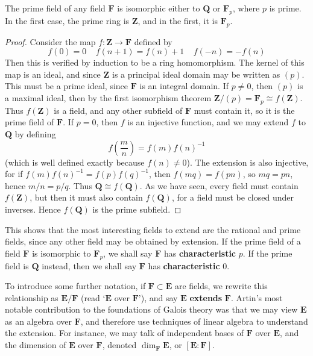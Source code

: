\begin{lemma}
    The prime field of any field $\mathbf{F}$ is isomorphic either to $\mathbf{Q}$ or $\mathbf{F}_p$, where $p$ is prime. In the first case, the prime ring is $\mathbf{Z}$, and in the first, it is $\mathbf{F}_p$.
\end{lemma}
\begin{proof}
    Consider the map $f: \mathbf{Z} \to \mathbf{F}$ defined by
    \[ f(0) = 0\ \ \ \ \ f(n+1) = f(n) + 1\ \ \ \ \ f(-n) = -f(n) \]
    Then this is verified by induction to be a ring homomorphism. The kernel of this map is an ideal, and since $\mathbf{Z}$ is a principal ideal domain may be written as $(p)$. This must be a prime ideal, since $\mathbf{F}$ is an integral domain. If $p \neq 0$, then $(p)$ is a maximal ideal, then by the first isomorphism theorem $\mathbf{Z} / (p) = \mathbf{F}_p \cong f(\mathbf{Z})$. Thus $f(\mathbf{Z})$ is a field, and any other subfield of $\mathbf{F}$ must contain it, so it is the prime field of $\mathbf{F}$. If $p = 0$, then $f$ is an injective function, and we may extend $f$ to $\mathbf{Q}$ by defining
    \[ f\left( \frac{m}{n} \right) = f(m) f(n)^{-1} \]
    (which is well defined exactly because $f(n) \neq 0$). The extension is also injective, for if $f(m) f(n)^{-1} = f(p) f(q)^{-1}$, then $f(mq) = f(pn)$, so $mq = pn$, hence $m/n = p/q$. Thus $\mathbf{Q} \cong f(\mathbf{Q})$. As we have seen, every field must contain $f(\mathbf{Z})$, but then it must also contain $f(\mathbf{Q})$, for a field must be closed under inverses. Hence $f(\mathbf{Q})$ is the prime subfield.
\end{proof}

This shows that the most interesting fields to extend are the rational and prime fields, since any other field may be obtained by extension. If the prime field of a field $\mathbf{F}$ is isomorphic to $\mathbf{F}_p$, we shall say $\mathbf{F}$ has {\bf characteristic} $p$. If the prime field is $\mathbf{Q}$ instead, then we shall say $\mathbf{F}$ has {\bf characteristic} 0.

To introduce some further notation, if $\mathbf{F} \subset \mathbf{E}$ are fields, we rewrite this relationship as $\mathbf{E}/\mathbf{F}$ (read `$\mathbf{E}$ over $\mathbf{F}$'), and say $\mathbf{E}$ {\bf extends} $\mathbf{F}$. Artin's most notable contribution to the foundations of Galois theory was that we may view $\mathbf{E}$ as an algebra over $\mathbf{F}$, and therefore use techniques of linear algebra to understand the extension. For instance, we may talk of independent bases of $\mathbf{F}$ over $\mathbf{E}$, and the dimension of $\mathbf{E}$ over $\mathbf{F}$, denoted $\dim_\mathbf{F} \mathbf{E}$, or $[\mathbf{E}: \mathbf{F}]$.


